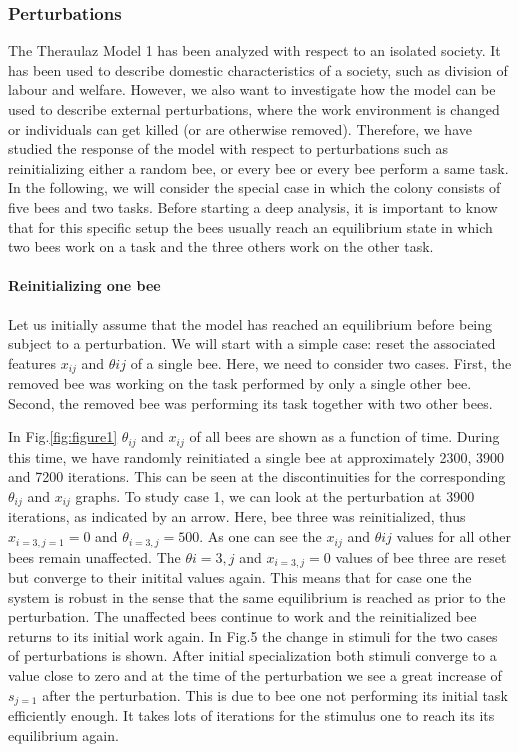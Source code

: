 \subsubsection{Perturbations}
The Theraulaz Model 1 has been analyzed with respect to an isolated society. It has been used to describe domestic characteristics of a society, such as division of labour and welfare. However, we also want to investigate how the model can be used to describe external perturbations, where the work environment is changed or individuals can get killed (or are otherwise removed). Therefore, we have studied the response of the model with respect to perturbations such as reinitializing either a random bee, or every bee or every bee perform a same task.
In the following, we will consider the special case in which the colony consists of five bees and two tasks. Before starting a deep analysis, it is important to know that for this specific setup the bees usually reach an equilibrium state in which two bees work on a task and the three others work on the other task. 

\paragraph{Reinitializing one bee}

Let us initially assume that the model has reached an equilibrium before being subject to a perturbation. We will start with a simple case: reset the associated features $x_{ij}$ and $\theta{ij}$ of a single bee. Here, we need to consider two cases. First, the removed bee was working on the task performed by only a single other bee. Second, the removed bee was performing its task together with two other bees.

In Fig.\ref{fig:figure1} $\theta_{ij}$ and $x_{ij}$ of all bees are shown as a function of time. During this time, we have randomly reinitiated a single bee at approximately 2300, 3900 and 7200 iterations. This can be seen at the discontinuities for the corresponding $\theta_{ij}$ and $x_{ij}$ graphs. To study case 1, we can look at the perturbation at 3900 iterations, as indicated by an arrow. Here, bee three was reinitialized, thus $x_{i=3,j=1}=0$ and $\theta_{i=3,j}=500$. As one can see the $x_{ij}$ and $\theta{ij}$ values for all other bees remain unaffected. The $\theta{i=3,j}$ and $x_{i=3,j}=0$ values of bee three are reset but converge to their initital values again. This means that for case one the system is robust in the sense that the same equilibrium is reached as prior to the perturbation. The unaffected bees continue to work and the reinitialized bee returns to its initial work again. In Fig.5 the change in stimuli for the two cases of perturbations is shown. After initial specialization both stimuli converge to a value close to zero and at the time of the perturbation we see a great increase of $s_{j=1}$ after the perturbation. This is due to bee one not performing its initial task efficiently enough. It takes lots of iterations for the stimulus one to reach its its equilibrium again. 

